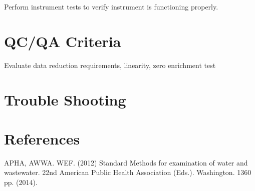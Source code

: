 \documentclass[12pt]{../SOP3_beta}\usepackage[]{graphicx}\usepackage[]{color}
\begin{document}
\NP Perform instrument tests to verify instrument is functioning properly.

\section{QC/QA Criteria}

\NP Evaluate data reduction requirements, linearity, zero enrichment test

\section{Trouble Shooting}

\section{References}

\NP APHA, AWWA. WEF. (2012) Standard Methods for examination of water and wastewater. 22nd American Public Health Association (Eds.). Washington. 1360 pp. (2014).
\end{document}
